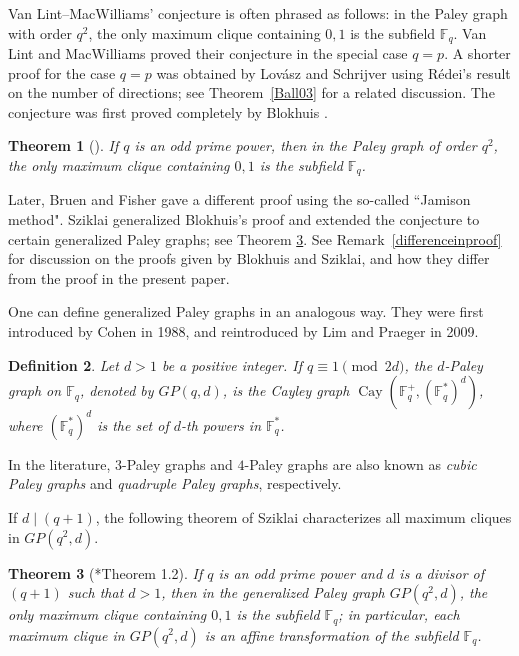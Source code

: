 \documentclass[12pt,reqno]{amsart}
\newtheorem{thm}{Theorem}[section]
\newtheorem{defn}[thm]{Definition}
\theoremstyle{definition}
\newcommand{\F}{\mathbb{F}}
\begin{document}
Van Lint--MacWilliams' conjecture is often phrased as follows: in the Paley graph with order $q^2$, the only maximum clique containing $0,1$ is the subfield $\F_q$. Van Lint and MacWilliams \cite{vLM78} proved their conjecture in the special case $q=p$. A shorter proof for the case $q=p$ was obtained by Lov\'{a}sz and Schrijver \cite{LS83} using R\'edei's result on the number of directions; see Theorem~\ref{Ball03} for a related discussion. The conjecture was first proved completely by Blokhuis \cite{Blo84}.

\begin{thm}[\cite{Blo84}] \label{Blo84}
If $q$ is an odd prime power, then in the Paley graph of order $q^2$, the only maximum clique containing $0,1$ is the subfield $\F_{q}$. 
\end{thm}

Later, Bruen and Fisher \cite{BF91} gave a different proof using the so-called ``Jamison method". Sziklai \cite{Szi99} generalized Blokhuis's proof and extended the conjecture to certain generalized Paley graphs; see Theorem \ref{Szi99}. See Remark~\ref{differenceinproof} for discussion on the proofs given by Blokhuis and Sziklai, and how they differ from the proof in the present paper.



One can define generalized Paley graphs in an analogous way. They were first introduced by Cohen \cite{SC} in 1988, and reintroduced by Lim and Praeger \cite{LP} in 2009. 

\begin{defn}
Let $d>1$ be a positive integer. If $q \equiv 1 \pmod {2d}$, the {\em $d$-Paley graph} on $\F_q$, denoted by $GP(q,d)$, is the Cayley graph  $\operatorname{Cay}(\F_q^+,(\F_q^*)^d)$, where $(\F_q^*)^d$ is the set of $d$-th powers in $\F_q^*$.
\end{defn} 
In the literature, $3$-Paley graphs and $4$-Paley graphs are also known as {\em cubic Paley graphs} and {\em quadruple Paley graphs}, respectively.

If $d \mid (q+1)$, the following theorem of Sziklai characterizes all maximum cliques in $GP(q^2,d)$.

\begin{thm}[\cite{Szi99}*{Theorem 1.2}] \label{Szi99}
If $q$ is an odd prime power and $d$ is a divisor of $(q+1)$ such that $d>1$, then in the generalized Paley graph $GP(q^2,d)$, the only maximum clique containing $0,1$ is the subfield $\F_{q}$; in particular, each maximum clique in $GP(q^2,d)$ is an affine transformation of the subfield $\F_{q}$.
\end{thm}
\end{document}
